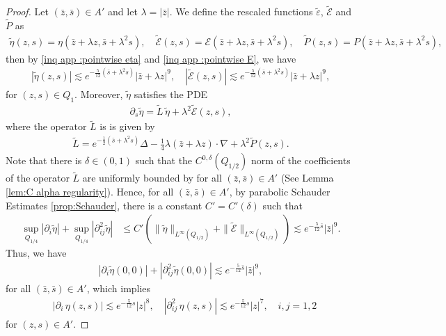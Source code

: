 \documentclass[11pt,reqno]{amsart}
\theoremstyle{definition}
\theoremstyle{bfremark}
\numberwithin{equation}{section}
\begin{document}
    \begin{proof}
        Let \((\bar{z},\bar{s}) \in A'\) and let \(\lambda=|\bar{z}|\). We define the rescaled functions \(\widetilde{\varepsilon}\), \(\widetilde{\mathcal{E}}\) and \(\widetilde{P}\) as
        \begin{align*}
            \widetilde{\eta}(z,s)=\eta(\bar{z}+\lambda z,\bar{s}+\lambda^2s),\quad \widetilde{\mathcal{E}}(z,s)=\mathcal{E}(\bar{z}+\lambda z,\bar{s}+\lambda^2s), \quad \widetilde{P}(z,s)=P(\bar{z}+\lambda z,\bar{s}+\lambda^2s),
        \end{align*}
        then by \ref{inq app :pointwise eta} and \ref{inq app :pointwise E}, we have
        \begin{align*}
            |\widetilde{\eta}(z,s)| \lesssim e^{-\frac{5}{12}(\bar{s}+\lambda^2s)}|\bar{z}+\lambda z|^9, \quad |\widetilde{\mathcal{E}}(z,s)| \lesssim e^{-\frac{5}{12}(\bar{s}+\lambda^2s)}|\bar{z}+\lambda z|^9,
        \end{align*}
        for \((z,s) \in Q_1\). Moreover, \(\widetilde{\eta}\) satisfies the PDE 
        \begin{align*}
            \partial_s \widetilde{\eta}=\widetilde{L}\,\widetilde{\eta}+\lambda^2\widetilde{\mathcal{E}}(z,s),
        \end{align*}
        where the operator \(\widetilde{L}\) is is given by
        \begin{align*}
            \widetilde{L}=e^{-\frac{1}{2}(\bar{s}+\lambda^2s)} \Delta-\frac{1}{4}\lambda(\bar{z}+\lambda z) \cdot \nabla+\lambda^2\widetilde{P}(z,s).
        \end{align*}
        Note that there is \(\delta \in (0,1)\) such that the 
        \(C^{0,\delta}(Q_{1/2})\) norm of the coefficients of the operator \( \widetilde{L}\) are uniformly bounded by for all \((\bar{z},\bar{s})\in A'\) (See Lemma \ref{lem:C alpha regularity}). Hence, for all \((\bar{z},\bar{s}) \in A'\), by parabolic Schauder Estimates \ref{prop:Schauder}, there is a constant \(C'=C'(\delta)\) such that
        \begin{align*}
            \sup_{Q_{1/4}}|\partial_i \widetilde{\eta}|+\sup_{Q_{1/4}}|\partial^2_{ij}\widetilde{\eta}| &\leq C'\left(\|\widetilde{\eta}\|_{L^{\infty}(Q_{1/2})}+\|\widetilde{\mathcal{E}}\|_{L^{\infty}(Q_{1/2})}\right) \lesssim e^{-\frac{5}{12}\bar{s}}|\bar{z}|^9.
        \end{align*}
        Thus, we have 
        \begin{align*}
            |\partial_i\widetilde{\eta}(0,0)|+|\partial^2_{ij}\widetilde{\eta}(0,0)| \lesssim e^{-\frac{5}{12}\bar{s}}|\bar{z}|^9,
        \end{align*}
        for all \((\bar{z},\bar{s}) \in A'\), which implies
        \begin{align*}
            &|\partial_i\,\eta(z,s)| \lesssim e^{-\frac{5}{12}s}|z|^8, \quad |\partial^2_{ij}\,\eta(z,s)| \lesssim e^{-\frac{5}{12}s}|z|^7, \quad i,j=1,2
        \end{align*}
        for \((z,s) \in A'\).
    \end{proof}
\end{document}

